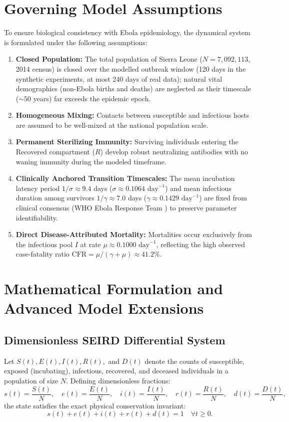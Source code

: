 \documentclass[11pt,a4paper]{article}
\begin{document}
\section{Governing Model Assumptions}
To ensure biological consistency with Ebola epidemiology, the dynamical system is formulated under the following assumptions:
\begin{enumerate}
    \item \textbf{Closed Population:} The total population of Sierra Leone ($N = 7{,}092{,}113$, 2014 census) is closed over the modelled outbreak window (120 days in the synthetic experiments, at most 240 days of real data); natural vital demographics (non-Ebola births and deaths) are neglected as their timescale ($\sim 50$ years) far exceeds the epidemic epoch.
    \item \textbf{Homogeneous Mixing:} Contacts between susceptible and infectious hosts are assumed to be well-mixed at the national population scale.
    \item \textbf{Permanent Sterilizing Immunity:} Surviving individuals entering the Recovered compartment ($R$) develop robust neutralizing antibodies with no waning immunity during the modeled timeframe.
    \item \textbf{Clinically Anchored Transition Timescales:} The mean incubation latency period $1/\sigma \approx 9.4$ days ($\sigma \approx 0.1064\text{ day}^{-1}$) and mean infectious duration among survivors $1/\gamma \approx 7.0$ days ($\gamma \approx 0.1429\text{ day}^{-1}$) are fixed from clinical consensus (WHO Ebola Response Team \cite{who2014ebola}) to preserve parameter identifiability.
    \item \textbf{Direct Disease-Attributed Mortality:} Mortalities occur exclusively from the infectious pool $I$ at rate $\mu \approx 0.1000\text{ day}^{-1}$, reflecting the high observed case-fatality ratio $\text{CFR} = \mu/(\gamma+\mu) \approx 41.2\%$.
\end{enumerate}

\section{Mathematical Formulation and Advanced Model Extensions}

\subsection{Dimensionless SEIRD Differential System}
Let $S(t), E(t), I(t), R(t),$ and $D(t)$ denote the counts of susceptible, exposed (incubating), infectious, recovered, and deceased individuals in a population of size $N$. Defining dimensionless fractions:
\begin{equation}
    s(t) = \frac{S(t)}{N}, \quad e(t) = \frac{E(t)}{N}, \quad i(t) = \frac{I(t)}{N}, \quad r(t) = \frac{R(t)}{N}, \quad d(t) = \frac{D(t)}{N},
\end{equation}
the state satisfies the exact physical conservation invariant:
\begin{equation}
    s(t) + e(t) + i(t) + r(t) + d(t) = 1 \quad \forall t \ge 0.
    \label{eq:conservation}
\end{equation}
\end{document}
